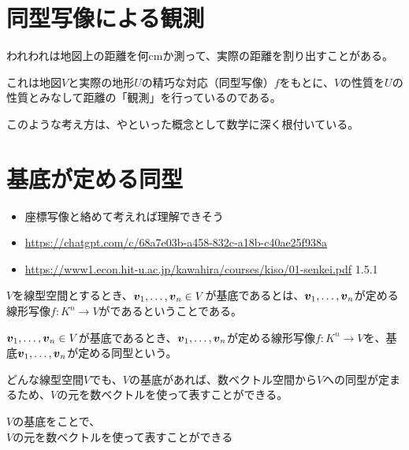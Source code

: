 \documentclass[../../../topic_linear-algebra]{subfiles}
\begin{document}
\sectionline
\section{同型写像による観測}

われわれは地図上の距離を何cmか測って、実際の距離を割り出すことがある。

これは地図$V$と実際の地形$U$の精巧な対応（同型写像）$f$をもとに、$V$の性質を$U$の性質とみなして距離の「観測」を行っているのである。

\br

このような考え方は、やといった概念として数学に深く根付いている。

\sectionline
\section{基底が定める同型}

\begin{mindflow}
  \begin{itemize}
    \item 座標写像と絡めて考えれば理解できそう
    \item \url{https://chatgpt.com/c/68a7e03b-a458-832c-a18b-c40ae25f938a}
    \item \url{https://www1.econ.hit-u.ac.jp/kawahira/courses/kiso/01-senkei.pdf} 1.5.1
  \end{itemize}
\end{mindflow}

$V$を線型空間とするとき、$\vb*{v}_1, \ldots, \vb*{v}_n \in V$が基底であるとは、$\vb*{v}_1, \ldots, \vb*{v}_n$が定める線形写像$f\colon K^n \to V$がであるということである。

\br

$\vb*{v}_1, \ldots, \vb*{v}_n \in V$が基底であるとき、$\vb*{v}_1, \ldots, \vb*{v}_n$が定める線形写像$f\colon K^n \to V$を、基底$\vb*{v}_1, \ldots, \vb*{v}_n$が定める同型という。

\br

どんな線型空間$V$でも、$V$の基底があれば、数ベクトル空間から$V$への同型が定まるため、$V$の元を数ベクトルを使って表すことができる。

\begin{emphabox}
  \begin{spacebox}
    \begin{center}
      $V$の基底をことで、\\
      $V$の元を数ベクトルを使って表すことができる
    \end{center}
  \end{spacebox}
\end{emphabox}
\end{document}
